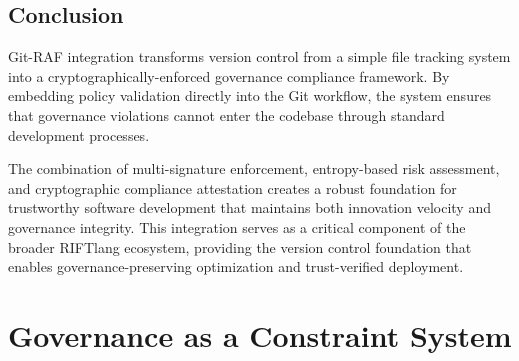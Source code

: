 \section*{Conclusion}

Git-RAF integration transforms version control from a simple file tracking system into a cryptographically-enforced governance compliance framework. By embedding policy validation directly into the Git workflow, the system ensures that governance violations cannot enter the codebase through standard development processes.

The combination of multi-signature enforcement, entropy-based risk assessment, and cryptographic compliance attestation creates a robust foundation for trustworthy software development that maintains both innovation velocity and governance integrity. This integration serves as a critical component of the broader RIFTlang ecosystem, providing the version control foundation that enables governance-preserving optimization and trust-verified deployment.

\chapter{Governance as a Constraint System}
\label{ch:governance_constraints}
